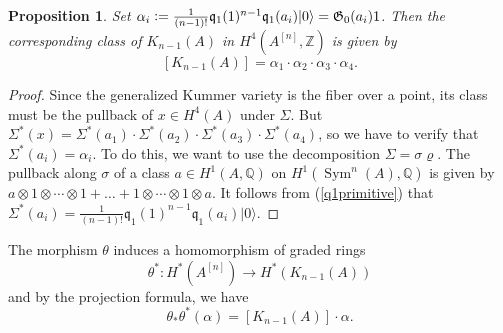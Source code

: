 \documentclass{alggeom}
\DeclareMathOperator{\Sym}{Sym}
\renewcommand{\rho}{\varrho}
\newcommand{\hilb}[1]{^{[#1]}}
\newcommand{\vac}{|0\rangle}
\newcommand{\G}{\mathfrak{G}}
\newcommand{\pone}{ \mathfrak{p}_{ - 1} }
\newcommand{\defIs}{\vcentcolon=}
\newcommand{\kum}[2]{K_{ #2 }( #1 )}
\newcommand{\Q}{\mathbb{Q}}
\newcommand{\Z}{\mathbb{Z}}
\newcommand{\kq}{\mathfrak{q}}
\theoremstyle{plain}
\newtheorem{proposition}[theorem]{Proposition}
\theoremstyle{definition}
\theoremstyle{remark}
\begin{document}
\begin{proposition}\label{KummerClass}
Set $\alpha_i \defIs  \frac{1}{(n-1)!}\kq_{1}(1)^{n-1}\kq_1(a_i)\vac = \G_0(a_i)1$. Then the corresponding class of %
$\kum{A}{n-1}$ in $H^4(A\hilb{n},\Z)$ is given by
$$
[\kum{A}{n-1}]=\alpha_1\cdot\alpha_2\cdot\alpha_3\cdot\alpha_4.
$$ 
\end{proposition}
\begin{proof}
Since the generalized Kummer variety is the fiber over a point, its 
class must be the pullback of $x\in H^4(A)$ under $\Sigma$. But $\Sigma^* (x) = \Sigma^*(a_1)\cdot \Sigma^*(a_2)\cdot \Sigma^*(a_3)\cdot \Sigma^*(a_4)$, so we have to verify that $\Sigma^* (a_i) = \alpha_i$. To do this, we want to use the decomposition $\Sigma = \sigma\rho$.
The pullback along $\sigma$ of a class $a\in H^1(A,\Q)$ on $H^1(\Sym^n(A),\Q)$ 
is given by $a\otimes 1\otimes \cdots\otimes 1 + \ldots + 1\otimes \cdots\otimes 1\otimes a$. It follows from (\ref{q1primitive}) that $\Sigma^* (a_i) = \frac{1}{(n-1)!}\kq_{1}(1)^{n-1}\kq_1(a_i)\vac $.
\end{proof}
The morphism $\theta$ induces a homomorphism of graded rings
\begin{equation}
\theta^* :H^*(A\hilb{n})\longrightarrow H^*(\kum{A}{n-1})
\end{equation}
and by the projection formula, we have
\begin{equation}\label{projectionFormula}
\theta_*\theta^*(\alpha)  = [\kum{A}{n-1}]\cdot\alpha.
\end{equation}
\end{document}
